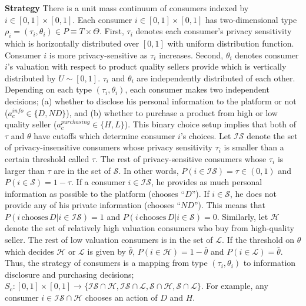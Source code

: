 \documentclass[12pt]{article}
\begin{document}
\textbf{Strategy} \quad There is a unit mass continuum of consumers indexed by $i \in [0,1]\times[0,1]$. Each consumer $i \in [0,1]\times[0,1]$ has two-dimensional type $\rho_i=(\tau_i, \theta_i) \in P \equiv T \times \Theta$. First, $\tau_i$ denotes each consumer's privacy sensitivity which is horizontally distributed over $[0,1]$ with uniform distribution function. Consumer $i$ is more privacy-sensitive as $\tau_i$ increases. Second, $\theta_i$ denotes consumer $i$'s valuation with respect to product quality sellers provide which is vertically distributed by $U \sim[0,1]$. $\tau_i$ and $\theta_i$ are independently distributed of each other. Depending on each type $(\tau_i,\theta_i)$, each consumer makes two independent decisions; (a) whether to disclose his personal information to the platform or not ($a_c^{info} \in \{D, ND\}$), and (b) whether to purchase a product from high or low quality seller ($a_c^{purchasing} \in \{H, L\}$). This binary choice setup implies that both of $\tau$ and $\theta$ have cutoffs which determine consumer $i$'s choices. Let $\mathcal{IS}$ denote the set of privacy-insensitive consumers whose privacy sensitivity $\tau_i$ is smaller than a certain threshold called $\tau$. The rest of privacy-sensitive consumers whose $\tau_i$ is larger than $\tau$ are in the set of $\mathcal{S}$. In other words, $P(i \in \mathcal{IS})=\tau \in(0,1)$ and $P(i \in \mathcal{S})=1-\tau$. If a consumer $i \in \mathcal{IS}$, he provides as much personal information as possible to the platform (chooses ``$D$''). If $i \in \mathcal{S}$, he does not provide any of his private information (chooses ``$ND$''). This means that $P(i \, \text{chooses}\, D|i\in\mathcal{IS})=1$ and $P(i \, \text{chooses}\, D|i\in\mathcal{S})=0$. Similarly, let $\mathcal{H}$ denote the set of relatively high valuation consumers who buy from high-quality seller. The rest of low valuation consumers is in the set of $\mathcal{L}$. If the threshold on $\theta$ which decides $\mathcal{H}$ or $\mathcal{L}$ is given by $\bar{\theta}$, $P(i \in \mathcal{H}) = 1-\bar{\theta}$ and $P(i \in \mathcal{L})=\bar{\theta}$. Thus, the strategy of consumers is a mapping from type $(\tau_i,\theta_i)$ to information disclosure and purchasing decisions; $S_c:[0,1]\times[0,1] \rightarrow \{\mathcal{IS} \cap \mathcal{H}, \mathcal{IS} \cap \mathcal{L}, \mathcal{S} \cap \mathcal{H}, \mathcal{S} \cap \mathcal{L}\}$. For example, any consumer $i \in \mathcal{IS}\cap\mathcal{H}$ chooses an action of $D$ and $H$. 
\end{document}
